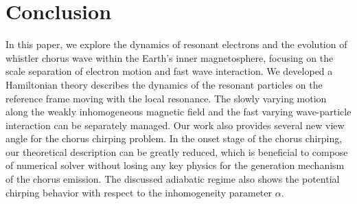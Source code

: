 \section{Conclusion}
\label{sec:conc}
In this paper, we explore the dynamics of resonant electrons and the evolution of whistler chorus wave within the Earth's inner magnetosphere, focusing on the scale separation of electron motion and fast wave interaction.
We developed a Hamiltonian theory describes the dynamics of the resonant particles on the reference frame moving with the local resonance.
The slowly varying motion along the weakly inhomogeneous magnetic field and the fast varying wave-particle interaction can be separately managed.
Our work also provides several new view angle for the chorus chirping problem.
In the onset stage of the chorus chirping, our theoretical description can be greatly reduced, which is beneficial to compose of numerical solver without losing any key physics for the generation mechanism of the chorus emission.  
The discussed adiabatic regime also shows the potential chirping behavior with respect to the inhomogeneity parameter $\alpha$.
